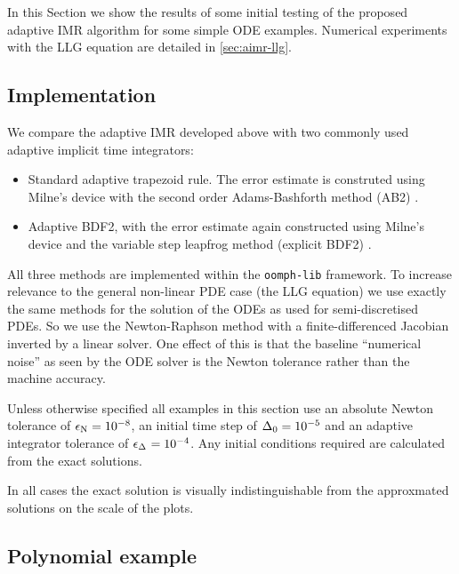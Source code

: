 
In this Section we show the results of some initial testing of the proposed adaptive IMR algorithm for some simple ODE examples.
Numerical experiments with the LLG equation are detailed in \autoref{sec:aimr-llg}.


\subsection{Implementation}
\label{sec:aimr-implementation}

We compare the adaptive IMR developed above with two commonly used adaptive implicit time integrators:
\begin{itemize}
\item Standard adaptive trapezoid rule. 
  The error estimate is construted using Milne's device with the second order Adams-Bashforth method (AB2) \cite[707]{GreshoSani}.
\item Adaptive BDF2, with the error estimate again constructed using Milne's device and the variable step leapfrog method (\ie explicit BDF2) \cite[715]{GreshoSani}.
\end{itemize}

All three methods are implemented within the \texttt{oomph-lib} framework.
To increase relevance to the general non-linear PDE case (\ie the LLG equation) we use exactly the same methods for the solution of the ODEs as used for semi-discretised PDEs.
So we use the Newton-Raphson method with a finite-differenced Jacobian inverted by a linear solver.
One effect of this is that the baseline ``numerical noise'' as seen by the ODE solver is the Newton tolerance rather than the machine accuracy.

Unless otherwise specified all examples in this section use an absolute Newton tolerance of $\epsilon_{\text{N}} = 10^{-8}$, an initial time step of $\Delta_{0} = 10^{-5}$ and an adaptive integrator tolerance of $\epsilon_{\Delta_{}} = 10^{-4}$.
Any initial conditions required are calculated from the exact solutions.

In all cases the exact solution is visually indistinguishable from the approxmated solutions on the scale of the plots.


\subsection{Polynomial example}
\label{sec:imr-polynomial-example}

